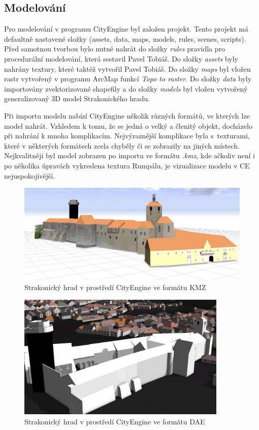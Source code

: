 \documentclass[thesis=M,czech]{FITthesis}[2012/06/26]
\begin{document}
\subsection{Modelování}
Pro modelování v programu CityEngine byl založen projekt. Tento projekt má defaultně nastavené složky (assets, data, maps, models, rules, scenes, scripts). Před samotnou tvorbou bylo nutné nahrát do složky \textit{rules} pravidla pro procedurální modelování, která sestavil Pavel Tobiáš. Do složky \textit{assets} byly nahrány textury, které taktéž vytvořil Pavel Tobiáš. Do složky \textit{maps} byl vložen rastr vytvořený v programu ArcMap funkcí \textit{Topo to raster}. Do složky \textit{data} byly importovány zvektorizované shapefily a do složky \textit{models} byl vložen vytvořený generalizovaný 3D model Strakonického hradu.

Při importu modelu nabízí CityEngine několik různých formátů, ve kterých lze model nahrát. Vzhledem k tomu, že se jedná o velký a členitý objekt, docházelo při nahrání k mnoha komplikacím. Nejvýraznější komplikace byla s~texturami, které v některých formátech zcela chyběly či se zobrazily na jiných místech. Nejkvalitněji byl model zobrazen po importu ve formátu \textit{.kmz}, kde ačkoliv není i po několika úpravách vykreslena textura Rumpálu, je vizualizace modelu v CE nejuspokojivější. 

\begin{figure}[h]
	\centering
	\includegraphics[width=13cm]{pics/hrad_ce.jpg}
	\caption{Strakonický hrad v prostředí CityEngine ve formátu KMZ}
	\label{obrazek:hradCE}
\end{figure}

\begin{figure}[h]
	\centering
	\includegraphics[width=10cm]{pics/dae.png}
	\caption{Strakonický hrad v prostředí CityEngine ve formátu DAE}
	\label{obrazek:hraddae}
\end{figure}
\end{document}
